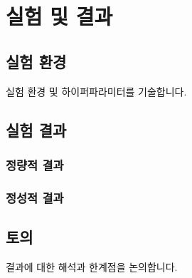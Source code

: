 \chapter{실험 및 결과}
\label{ch:result}

\section{실험 환경}

실험 환경 및 하이퍼파라미터를 기술합니다.

\section{실험 결과}

\subsection{정량적 결과}

\subsection{정성적 결과}

\section{토의}

결과에 대한 해석과 한계점을 논의합니다.
